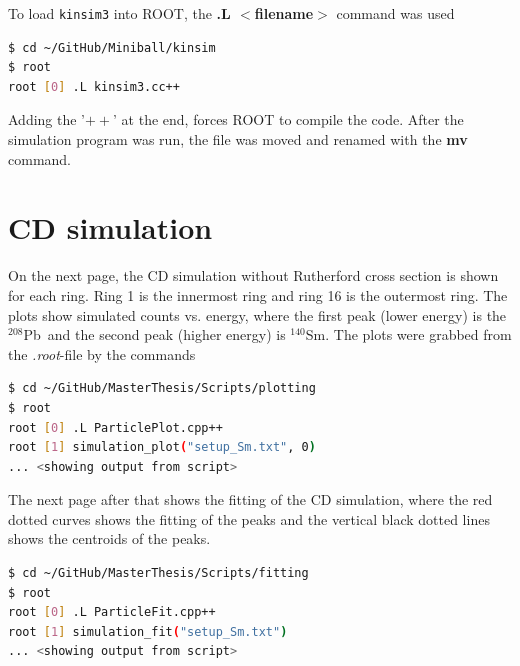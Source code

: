 \documentclass[twoside,english]{uiofysmaster/uiofysmaster}
\newcommand{\Sm}{$^{140}$Sm} %
\newcommand{\Pb}{$^{208}$Pb}
\begin{document}
\begin{appendices}
To load \texttt{kinsim3} into ROOT, the \textbf{.L $<$filename$>$} command was used
\begin{lstlisting}[language=sh]
$ cd ~/GitHub/Miniball/kinsim
$ root
root [0] .L kinsim3.cc++
\end{lstlisting}
Adding the '$++$' at the end, forces ROOT to compile the code. 
After the simulation program was run, the file was moved and renamed with the \textbf{mv} command. 


\section{CD simulation}
On the next page, the CD simulation without Rutherford cross section is shown for each ring. 
Ring 1 is the innermost ring and ring 16 is the outermost ring. 
The plots show simulated counts vs. energy, where the first peak (lower energy) is the \Pb\ and the second peak (higher energy) is \Sm. 
The plots were grabbed from the \textit{.root}-file by the commands
\begin{lstlisting}[language=sh]
$ cd ~/GitHub/MasterThesis/Scripts/plotting
$ root
root [0] .L ParticlePlot.cpp++
root [1] simulation_plot("setup_Sm.txt", 0)
... <showing output from script>
\end{lstlisting}


The next page after that shows the fitting of the CD simulation, where the red dotted curves shows the fitting of the peaks and the vertical black dotted lines shows the centroids of the peaks.

\begin{lstlisting}[language=sh]
$ cd ~/GitHub/MasterThesis/Scripts/fitting
$ root
root [0] .L ParticleFit.cpp++
root [1] simulation_fit("setup_Sm.txt")
... <showing output from script>
\end{lstlisting}


\end{appendices}
\end{document}
